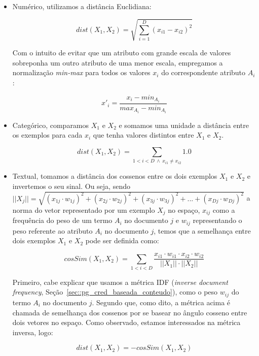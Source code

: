 \begin{itemize}

\item Numérico, utilizamos a distância Euclidiana:

\begin{equation}\label{eqn::distancia_euclidiana}
    dist(X_1, X_2) =  \sqrt{\sum_{i=1}^D (x_{i1}-x_{i2})^2}
\end{equation}

    Com o intuito de evitar que um atributo com grande escala de valores sobreponha um outro atributo de uma menor escala, empregamos a normalização \textit{min-max} para todos os valores $x_i$ do correspondente atributo $A_i$:

\begin{equation}\label{eqn::distancia_euclidiana}
    x'_{i} =  \frac{x_{i} - min_{A_i}}{ max_{A_i} - min_{A_i} }
\end{equation}

\item Categórico, comparamos $X_1$ e $X_2$ e somamos uma unidade a distância entre os exemplos para cada $x_i$ que tenha valores distintos entre $X_1$ e $X_2$.

\begin{equation}\label{eqn::distancia_cat}
   dist(X_1, X_2) = \sum_{1 < i < D \ \wedge \ x_{i1} \neq x_{i2}} 1.0
\end{equation}

\item Textual, tomamos a distância dos cossenos entre os dois exemplos $X_1$ e $X_2$ e invertemos o seu sinal. Ou seja, sendo $||X_j|| = \sqrt{ (x_{1j} \cdot w_{1j})^2 + (x_{2j} \cdot w_{2j})^2 + (x_{3j} \cdot w_{3j})^2 + ... + (x_{Dj} \cdot w_{Dj})^2}$ a norma do vetor representado por um exemplo $X_j$ no espaço, $x_{ij}$ como a frequência do peso de um termo $A_i$ no documento $j$ e $w_{ij}$ representando o peso referente ao atributo $A_i$ no documento $j$, temos que a semelhança entre dois exemplos $X_1$ e $X_2$ pode ser definida como:

\begin{equation}\label{eqn::distancia_texto}
    cosSim(X_1, X_2) = \sum\limits_{1 < i < D} \frac{ x_{i1} \cdot w_{i1} \cdot x_{i2} \cdot w_{i2} }{ ||X_1|| \cdot ||X_2|| }
\end{equation}

Primeiro, cabe explicar que usamos a métrica \textsc{IDF} (\textit{inverse document frequency}, Seção~\ref{sec::pg_cred_baseada_conteudo}), como o peso $w_{ij}$ do termo $A_i$ no documento $j$. Segundo que, como dito, a métrica acima é chamada de semelhança dos cossenos por se basear no ângulo cosseno entre dois vetores no espaço. Como observado, estamos interessados na métrica inversa, logo:

 \begin{equation}\label{eqn::distancia_texto2}
    dist(X_1, X_2) = - cosSim(X_1, X_2)
\end{equation}


\end{itemize}

